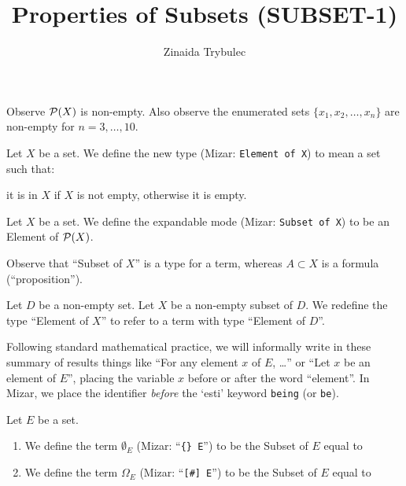 \documentclass{article}
\title{Properties of Subsets (SUBSET-1)}
\author{Zinaida Trybulec}
\begin{document}
\maketitle

Observe $\mathcal{P}(X)$ is non-empty. Also observe the enumerated sets
$\{x_{1},x_{2},\dots,x_{n}\}$ are non-empty for $n=3,\dots,10$.

\begin{definition}
Let $X$ be a set.
We define the new type  (Mizar: \verb#Element of X#)
to mean a set such that:
\begin{defn}
\item it is in $X$ if $X$ is not empty, otherwise it is empty.
\end{defn}
\end{definition}

\begin{definition}
Let $X$ be a set. We define the expandable mode 
(Mizar: \verb#Subset of X#)
to be an Element of $\mathcal{P}(X)$.
\end{definition}

\begin{remark}
Observe that ``Subset of $X$'' is a type for a term, whereas $A\subset X$
is a formula (``proposition'').
\end{remark}

\begin{definition}
Let $D$ be a non-empty set. Let $X$ be a non-empty subset of $D$.
We redefine the type ``Element of $X$'' to refer to a term with type
``Element of $D$''.
\end{definition}

\begin{remark}
Following standard mathematical practice, we will informally write in
these summary of results things like ``For any element $x$ of $E$, \dots''
or ``Let $x$ be an element of $E$'', placing the variable $x$ before or
after the word ``element''. In Mizar, we place the identifier \emph{before}
the `esti' keyword \verb#being# (or \verb#be#).
\end{remark}

\begin{definition}
Let $E$ be a set.
\begin{enumerate}
\item We define the term $\emptyset_{E}$ (Mizar: ``\verb#{} E#'') to be
  the Subset of $E$ equal to
  \begin{defn}
  \item $\emptyset$
  \end{defn}
\item We define the term $\Omega_{E}$ (Mizar: ``\verb|[#] E|'') to be
  the Subset of $E$ equal to
\end{enumerate}
\end{definition}
\end{document}
